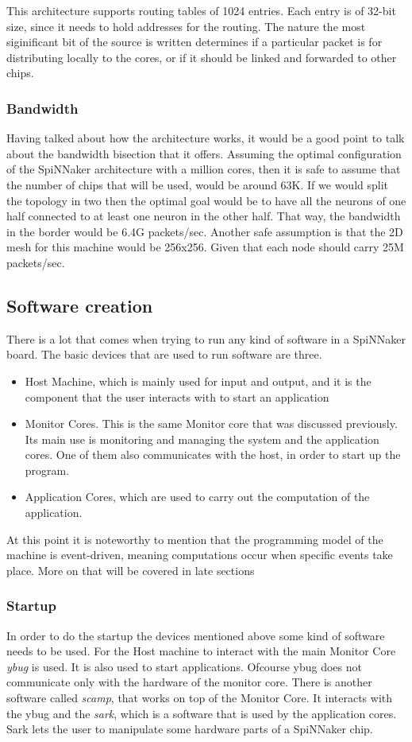 \documentclass[12pt,a4paper]{article}
\begin{document}
This architecture supports routing tables of 1024 entries. Each entry is of 32-bit size, since it needs to hold addresses for the routing. The nature the most siginificant bit of the source is written determines if a particular packet is for distributing locally to the cores, or if it should be linked and forwarded to other chips\cite{docfile}.
\subsubsection{Bandwidth}
Having talked about how the architecture works, it would be a good point to talk about the bandwidth bisection that it offers. Assuming the optimal configuration of the SpiNNaker architecture with a million cores, then it is safe to assume that the number of chips that will be used, would be around 63K. If we would split the topology in two then the optimal goal would be to have all the neurons of one half connected to at least one neuron in the other half. That way, the bandwidth in the border would be 6.4G packets/sec. Another safe assumption is that the 2D mesh for this machine would be 256x256. Given that each node should carry 25M packets/sec\cite{docfile}\cite{navaridas2009understanding}.
\newpage
\subsection{Software creation}
There is a lot that comes when trying to run any kind of software in a SpiNNaker board. The basic devices that are used to run software are three.
\begin{itemize}
\item Host Machine, which is mainly used for input and output, and it is the component that the user interacts with to start an application
\item Monitor Cores. This is the same Monitor core that was discussed previously. Its main use is monitoring and managing the system and the application cores. One of them also communicates with the host, in order to start up the program.
\item Application Cores, which are used to carry out the computation of the application.\cite{furber2012overview}
\end{itemize}

At this point it is noteworthy to mention that the programming model of the machine is event-driven, meaning computations occur when specific events take place. More on that will be covered in late sections
\subsubsection{Startup}
In order to do the startup the devices mentioned above some kind of software needs to be used. For the Host machine to interact with the main Monitor Core \emph{ybug} is used. It is also used to start applications. Ofcourse ybug does not communicate only with the hardware of the monitor core. There is another software called \emph{scamp}, that works on top of the Monitor Core. It interacts with the ybug and the \emph{sark}, which is a software that is used by the application cores. Sark lets the user to manipulate some hardware parts of a SpiNNaker chip.\cite{spinnweb}
\end{document}
